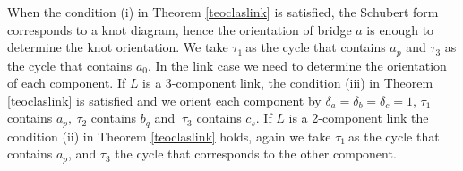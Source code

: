 \documentclass[12pt]{article}%
\begin{document}
When the condition (i) in Theorem \ref{teoclaslink} is satisfied, the Schubert
form corresponds to a knot diagram, hence the orientation of bridge $a$ is
enough to determine the knot orientation. We take $\tau_{1}\ $as the cycle
that contains $a_{p}$ and $\tau_{3}$ as the cycle that contains $a_{0}$. In
the link case we need to determine the orientation of each component. If $L$
is a 3-component link, the condition (iii) in Theorem \ref{teoclaslink} is
satisfied and we orient each component by $\delta_{a}=\delta_{b}=\delta_{c}%
=1$, $\tau_{1}$ contains $a_{p},\ \tau_{2}$ contains $b_{q}$ and $\ \tau_{3}$
contains $c_{s}$. If $L$ is a 2-component link the condition (ii) in Theorem
\ref{teoclaslink} holds, again we take $\tau_{1}\ $as the cycle that contains
$a_{p}$, and $\tau_{3}$ the cycle that corresponds to the other component.\ 
\end{document}
